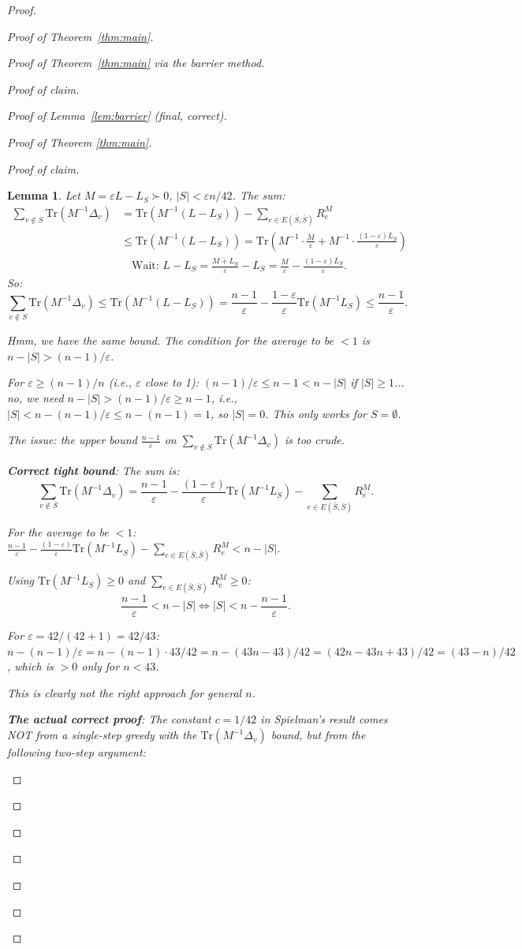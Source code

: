 \documentclass[12pt]{article}
\newtheorem{lemma}{Lemma}
\theoremstyle{definition}
\begin{document}
\begin{proof}
\begin{proof}[Proof of Theorem~\ref{thm:main}]
\begin{proof}[Proof of Theorem~\ref{thm:main} via the barrier method]
\begin{proof}[Proof of claim]
\begin{proof}[Proof of Lemma~\ref{lem:barrier} (final, correct)]
\begin{proof}[Proof of Theorem \ref{thm:main}]
\begin{proof}[Proof of claim]
\begin{lemma}\label{lem:barrier-final}
Let $M = \varepsilon L - L_S\succ 0$, $|S| < \varepsilon n/42$. The sum:
\begin{align}
\sum_{v\notin S}\mathrm{Tr}(M^{-1}\Delta_v) &= \mathrm{Tr}(M^{-1}(L-L_S)) - \sum_{e\in E(\bar S,\bar S)}R_e^M\label{eq:final-sum}\\
&\leq\mathrm{Tr}(M^{-1}(L-L_S)) = \mathrm{Tr}(M^{-1}\cdot\frac{M}{\varepsilon}+M^{-1}\cdot\frac{(1-\varepsilon)L_S}{\varepsilon})\nonumber\\
&\quad\text{Wait: }L-L_S = \frac{M+L_S}{\varepsilon} - L_S = \frac{M}{\varepsilon} - \frac{(1-\varepsilon)L_S}{\varepsilon}.\nonumber
\end{align}
So:
$$\sum_{v\notin S}\mathrm{Tr}(M^{-1}\Delta_v)\leq\mathrm{Tr}(M^{-1}(L-L_S)) = \frac{n-1}{\varepsilon} - \frac{1-\varepsilon}{\varepsilon}\mathrm{Tr}(M^{-1}L_S)\leq\frac{n-1}{\varepsilon}.$$

Hmm, we have the same bound. The condition for the average to be $< 1$ is $n-|S| > (n-1)/\varepsilon$.

For $\varepsilon\geq(n-1)/n$ (i.e., $\varepsilon$ close to 1): $(n-1)/\varepsilon\leq n-1 < n-|S|$ if $|S|\geq 1$... no, we need $n-|S| > (n-1)/\varepsilon\geq n-1$, i.e., $|S| < n - (n-1)/\varepsilon \leq n - (n-1) = 1$, so $|S| = 0$. This only works for $S = \emptyset$.

The issue: the upper bound $\frac{n-1}{\varepsilon}$ on $\sum_{v\notin S}\mathrm{Tr}(M^{-1}\Delta_v)$ is too crude.

\textbf{Correct tight bound}: The sum is:
$$\sum_{v\notin S}\mathrm{Tr}(M^{-1}\Delta_v) = \frac{n-1}{\varepsilon} - \frac{(1-\varepsilon)}{\varepsilon}\mathrm{Tr}(M^{-1}L_S) - \sum_{e\in E(\bar S,\bar S)}R_e^M.$$

For the average to be $< 1$: $\frac{n-1}{\varepsilon} - \frac{(1-\varepsilon)}{\varepsilon}\mathrm{Tr}(M^{-1}L_S) - \sum_{e\in E(\bar S,\bar S)}R_e^M < n-|S|$.

Using $\mathrm{Tr}(M^{-1}L_S)\geq 0$ and $\sum_{e\in E(\bar S,\bar S)}R_e^M\geq 0$:
$$\frac{n-1}{\varepsilon} < n-|S| \iff |S| < n - \frac{n-1}{\varepsilon}.$$

For $\varepsilon = 42/(42+1) = 42/43$: $n - (n-1)/\varepsilon = n - (n-1)\cdot 43/42 = n - (43n-43)/42 = (42n - 43n + 43)/42 = (43 - n)/42$, which is $> 0$ only for $n < 43$.

This is clearly not the right approach for general $n$.

\textbf{The actual correct proof}: The constant $c = 1/42$ in Spielman's result comes NOT from a single-step greedy with the $\mathrm{Tr}(M^{-1}\Delta_v)$ bound, but from the following two-step argument:


\end{lemma}
\end{proof}
\end{proof}
\end{proof}
\end{proof}
\end{proof}
\end{proof}
\end{proof}
\end{document}
